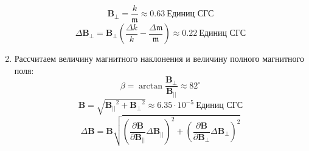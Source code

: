 \documentclass[a4paper, 12pt]{article}
\begin{document}
\begin{enumerate}
\begin{equation*}
        \mathbf{B_{\perp}} = \frac{k}{\mathfrak{m}} \approx 0.63\ \text{Единиц СГС}
    \end{equation*}
    \begin{equation*}
        \Delta \mathbf{B_{\perp}} = \mathbf{B_{\perp}}\left(\frac{\Delta k}{k} - \frac{\Delta \mathfrak{m}}{\mathfrak{m}}\right) \approx 0.22\ \text{Единиц СГС}
    \end{equation*}
    \item Рассчитаем величину магнитного наклонения и величину полного магнитного поля:
    \begin{equation*}
            \beta = \arctan{\frac{\mathbf{B_{\perp}}}{\mathbf{B_{||}}}} \approx 82^\circ
    \end{equation*}
    \begin{equation*}
        \mathbf{B} = \sqrt{\mathbf{B_{||}}^{2} + \mathbf{B_{\perp}}^{2}} \approx 6.35\cdot 10^{-5}\ \text{Единиц СГС}
    \end{equation*}
    \begin{equation*}
        \Delta \mathbf{B} = \mathbf{B}\sqrt{\left(\frac{\partial \mathbf{B}}{\partial \mathbf{B_{||}}}\Delta \mathbf{B_{||}}\right)^{2} + \left(\frac{\partial \mathbf{B}}{\partial \mathbf{B_{\perp}}}\Delta \mathbf{B_{\perp}}\right)^{2}}
    \end{equation*}

\end{enumerate}
\end{document}
